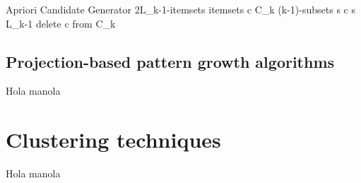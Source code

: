 %    


\begin{pseudocode}{Apriori Candidate Generator 2}{L_{k-1}-itemsets}
\label{pc:apriori_candidate_generator2}
    \FORALL itemsets \quad c \in C_{k} \DO
    \BEGIN
        \FORALL (k-1)-subsets \quad s \in c \DO
        \BEGIN
            \IF s \not\in  L_{k-1} \THEN
                delete \quad c \quad from \quad C_{k}\\
        \END
    \END
\end{pseudocode}


\subsection{Projection-based pattern growth algorithms}

Hola manola

\section{Clustering techniques}

Hola manola


